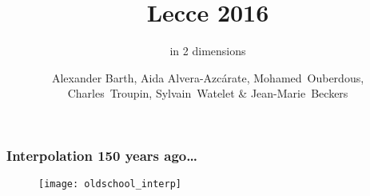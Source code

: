 
\parindent 0cm

\author[Alexander Barth, Aida Alvera-Azc\'{a}rate, Mohamed~Ouberdous, Charles~Troupin, Sylvain~Watelet \& Jean-Marie~Beckers]{Alexander Barth, Aida Alvera-Azc\'{a}rate, Mohamed~Ouberdous,\\
 Charles~Troupin, Sylvain~Watelet \& Jean-Marie~Beckers}
  
\title[]{\diva Lecce 2016}
\subtitle{\diva in 2 dimensions}
\date{}


\maketitlepage %

\begin{frame}
\frametitle{Interpolation 150 years ago\ldots}

\begin{figure}[H]
\centering
\texttt{[image: oldschool\_interp]}
\end{figure}


\end{frame}

